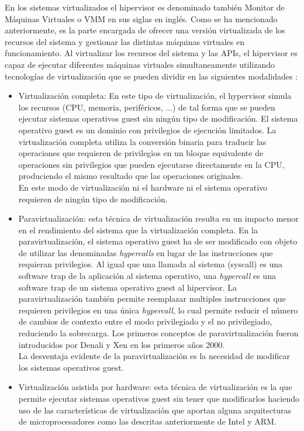 En los sistemas virtualizados el hipervisor es denominado también Monitor de Máquinas Virtuales o \acrshort{VMM} en sus siglas en inglés. Como se ha mencionado anteriormente, es la parte encargada de ofrecer una versión virtualizada de los recursos del sistema y gestionar las distintas máquinas virtuales en funcionamiento. Al virtualizar los recursos del sistema y las APIs, el hipervisor es capaz de ejecutar diferentes máquinas virtuales simultaneamente utilizando tecnologías de virtualización que se pueden dividir en las siguientes modalidades \cite{hyper_perf_arm}:
\begin{itemize}
	\item Virtualización completa: En este tipo de virtualización, el hypervisor simula los recursos (CPU, memoria, periféricos, ...) de tal forma que se pueden ejecutar sistemas operativos guest sin ningún tipo de modificación. El sistema operativo guest es un dominio con privilegios de ejecución limitados. La virtualización completa utiliza la conversión binaria para traducir las operaciones que requieren de privilegios en un bloque equivalente de operaciones sin privilegios que pueden ejecutarse directamente en la CPU, produciendo el mismo resultado que las operaciones originales.\\
	En este modo de virtualización ni el hardware ni el sistema operativo requieren de ningún tipo de modificación.
	\item Paravirtualización: esta técnica de virtualización resulta en un impacto menor en el rendimiento del sistema que la virtualización completa. En la paravirtualización, el sistema operativo guest ha de ser modificado con objeto de utilizar las denominadas \textit{hypercalls} en lugar de las instrucciones que requieran privilegios. Al igual que una llamada al sistema (syscall) es una software trap de la aplicación al sistema operativo, una \textit{hypercall} es una software trap de un sistema operativo guest al hipervisor. La paravirtualización también permite reemplazar multiples instrucciones que requieren privilegios en una única \textit{hypercall}, lo cual permite reducir el número de cambios de contexto entre el modo privilegiado y el no privilegiado, reduciendo la sobrecarga. Los primeros conceptos de paravirtualización fueron introducidos por Denali \cite{denali} y Xen en los primeros años 2000.\\
	La desventaja evidente de la paravirtualización es la necesidad de modificar los sistemas operativos guest.
	\item Virtualización asistida por hardware: esta técnica de virtualización es la que permite ejecutar sistemas operativos guest sin tener que modificarlos haciendo uso de las características de virtualización que aportan alguna arquitecturas de microprocesadores como las descritas anteriormente de Intel y ARM.
\end{itemize}

